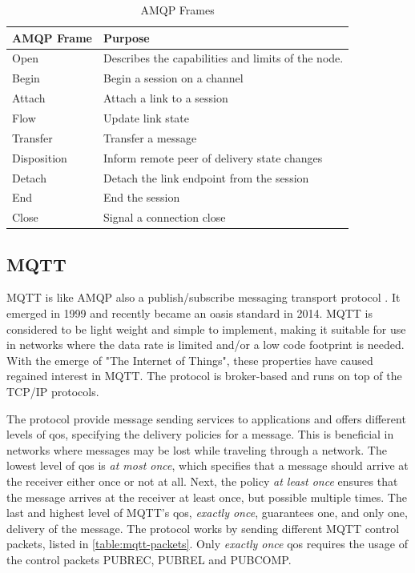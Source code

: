 \begin{table}[h]
\begin{tabularx}{\textwidth}{| X | X |}
\hline
  \textbf{AMQP Frame} & \textbf{Purpose} \\ \hline
  Open & Describes the capabilities and limits of the node. \\ \hline
  Begin & Begin a session on a channel \\ \hline
  Attach & Attach a link to a session \\ \hline
  Flow & Update link state \\ \hline
  Transfer & Transfer a message \\ \hline
  Disposition & Inform remote peer of delivery state changes \\ \hline
  Detach & Detach the link endpoint from the session \\ \hline
  End & End the session\\ \hline
  Close & Signal a connection close\\ \hline
\end{tabularx}
\caption{AMQP Frames}
\label{table-amqp-frames}
\end{table}

\subsection{MQTT}

MQTT is like AMQP also a publish/subscribe messaging transport protocol
\cite{oasis-mqtt}.  It emerged in 1999 and recently became an \gls{oasis}
standard in 2014. MQTT is considered to be light weight and simple to implement,
making it suitable for use in networks where the data rate is limited and/or a
low code footprint is needed. With the emerge of "The Internet of Things", these
properties have caused regained interest in MQTT. The protocol is broker-based
and runs on top of the TCP/IP protocols.

The protocol provide message sending services to applications and offers
different levels of \gls{qos}, specifying the delivery policies for a message.
This is beneficial in networks where messages may be lost while traveling
through a network. The lowest level of \gls{qos} is \textit{at most once}, which
specifies that a message should arrive at the receiver either once or not at
all. Next, the policy \textit{at least once} ensures that the message arrives at
the receiver at least once, but possible multiple times. The last and highest
level of MQTT's \gls{qos}, \textit{exactly once}, guarantees one, and only one,
delivery of the message. The protocol works by sending different MQTT control
packets, listed in \cref{table:mqtt-packets}. Only \textit{exactly once}
\gls{qos} requires the usage of the control packets PUBREC, PUBREL and PUBCOMP.


